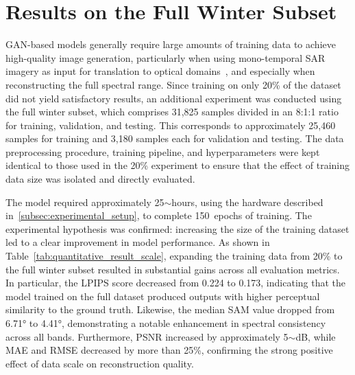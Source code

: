 \section{Results on the Full Winter Subset}
GAN-based models generally require large amounts of training data to achieve high-quality image generation, particularly when using mono-temporal SAR imagery as input for translation to optical domains~\cite{sar_2_opt_CGAN_survey_taxonomy}, and especially when reconstructing the full spectral range. Since training on only 20\% of the dataset did not yield satisfactory results, an additional experiment was conducted using the full winter subset, which comprises 31,825 samples divided in an 8:1:1 ratio for training, validation, and testing. This corresponds to approximately 25,460 samples for training and 3,180 samples each for validation and testing. The data preprocessing procedure, training pipeline, and hyperparameters were kept identical to those used in the 20\% experiment to ensure that the effect of training data size was isolated and directly evaluated.

The model required approximately 25$\sim$hours, using the hardware described in~\ref{subsec:experimental_setup}, to complete 150~epochs of training. The experimental hypothesis was confirmed: increasing the size of the training dataset led to a clear improvement in model performance. As shown in Table~\ref{tab:quantitative_result_scale}, expanding the training data from 20\% to the full winter subset resulted in substantial gains across all evaluation metrics. In particular, the LPIPS score decreased from 0.224 to 0.173, indicating that the model trained on the full dataset produced outputs with higher perceptual similarity to the ground truth. Likewise, the median SAM value dropped from 6.71° to 4.41°, demonstrating a notable enhancement in spectral consistency across all bands. Furthermore, PSNR increased by approximately 5$\sim$dB, while MAE and RMSE decreased by more than 25\%, confirming the strong positive effect of data scale on reconstruction quality.

